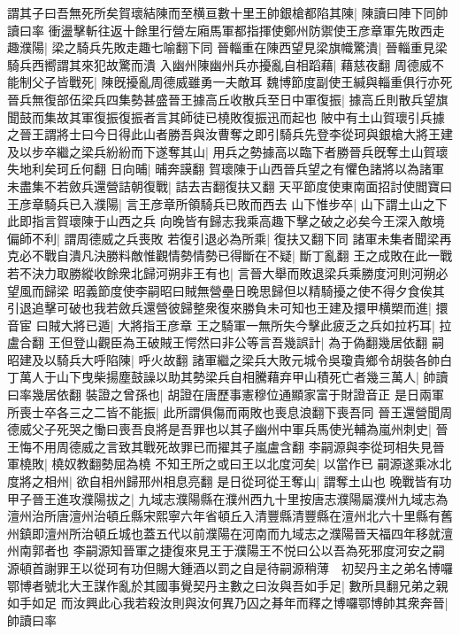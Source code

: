 謂其子曰吾無死所矣賀瓌結陳而至横亘數十里王帥銀槍都陷其陳|{
	陳讀曰陣下同帥讀曰率}
衝盪擊斬往返十餘里行營左廂馬軍都指揮使鄭州防禦使王彦章軍先敗西走趣濮陽|{
	梁之騎兵先敗走趣七喻翻下同}
晉輜重在陳西望見梁旗幟驚潰|{
	晉輜重見梁騎兵西嚮謂其來犯故驚而潰}
入幽州陳幽州兵亦擾亂自相蹈藉|{
	藉慈夜翻}
周德威不能制父子皆戰死|{
	陳旣擾亂周德威雖勇一夫敵耳}
魏博節度副使王緘與輜重俱行亦死晉兵無復部伍梁兵四集勢甚盛晉王據高丘收散兵至日中軍復振|{
	據高丘則散兵望旗聞鼓而集故其軍復振復振者言其師徒已橈敗復振迅而起也}
陂中有土山賀瓌引兵據之晉王謂將士曰今日得此山者勝吾與汝曹奪之即引騎兵先登李從珂與銀槍大將王建及以步卒繼之梁兵紛紛而下遂奪其山|{
	用兵之勢據高以臨下者勝晉兵旣奪土山賀瓌失地利矣珂丘何翻}
日向晡|{
	晡奔謨翻}
賀瓌陳于山西晉兵望之有懼色諸將以為諸軍未盡集不若斂兵還營詰朝復戰|{
	詰去吉翻復扶又翻}
天平節度使東南面招討使閻寶曰王彦章騎兵已入濮陽|{
	言王彦章所領騎兵已敗而西去}
山下惟步卒|{
	山下謂土山之下此即指言賀瓌陳于山西之兵}
向晚皆有歸志我乘高趣下擊之破之必矣今王深入敵境偏師不利|{
	謂周德威之兵喪敗}
若復引退必為所乘|{
	復扶又翻下同}
諸軍未集者聞梁再克必不戰自潰凡決勝料敵惟觀情勢情勢已得斷在不疑|{
	斷丁亂翻}
王之成敗在此一戰若不決力取勝縱收餘衆北歸河朔非王有也|{
	言晉大舉而敗退梁兵乘勝度河則河朔必望風而歸梁}
昭義節度使李嗣昭曰賊無營壘日晚思歸但以精騎擾之使不得夕食俟其引退追擊可破也我若斂兵還營彼歸整衆復來勝負未可知也王建及擐甲横槊而進|{
	擐音宦}
曰賊大將已遁|{
	大將指王彦章}
王之騎軍一無所失今擊此疲乏之兵如拉朽耳|{
	拉盧合翻}
王但登山觀臣為王破賊王愕然曰非公等言吾幾誤計|{
	為于偽翻幾居依翻}
嗣昭建及以騎兵大呼陷陳|{
	呼火故翻}
諸軍繼之梁兵大敗元城令吳瓊貴鄉令胡裝各帥白丁萬人于山下曳柴揚塵鼓譟以助其勢梁兵自相騰藉弃甲山積死亡者幾三萬人|{
	帥讀曰率幾居依翻}
裝證之曾孫也|{
	胡證在唐歷事憲穆位通顯家富于財證音正}
是日兩軍所喪士卒各三之二皆不能振|{
	此所謂俱傷而兩敗也喪息浪翻下喪吾同}
晉王還營聞周德威父子死哭之慟曰喪吾良將是吾罪也以其子幽州中軍兵馬使光輔為嵐州刺史|{
	晉王悔不用周德威之言致其戰死故罪已而擢其子嵐盧含翻}
李嗣源與李從珂相失見晉軍橈敗|{
	橈奴教翻勢屈為橈}
不知王所之或曰王以北度河矣|{
	以當作已}
嗣源遂乘冰北度將之相州|{
	欲自相州歸邢州相息亮翻}
是日從珂從王奪山|{
	謂奪土山也}
晚戰皆有功甲子晉王進攻濮陽拔之|{
	九域志濮陽縣在濮州西九十里按唐志濮陽屬濮州九域志為澶州治所唐澶州治頓丘縣宋熙寧六年省頓丘入清豐縣清豐縣在澶州北六十里縣有舊州鎮即澶州所治頓丘城也蓋五代以前濮陽在河南而九域志之濮陽晉天福四年移就澶州南郭者也}
李嗣源知晉軍之捷復來見王于濮陽王不悦曰公以吾為死邪度河安之嗣源頓首謝罪王以從珂有功但賜大鍾酒以罰之自是待嗣源稍薄　初契丹主之弟名博囉鄂博者號北大王謀作亂於其國事覺契丹主數之曰汝與吾如手足|{
	數所具翻兄弟之親如手如足}
而汝興此心我若殺汝則與汝何異乃囚之朞年而釋之博囉鄂博帥其衆奔晉|{
	帥讀曰率}
